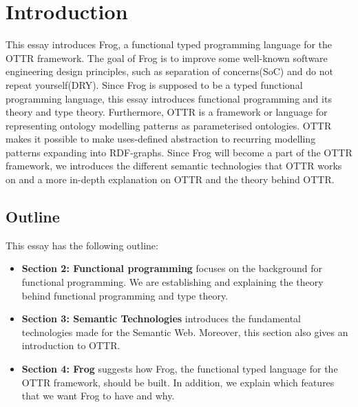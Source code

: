 
\section{Introduction}
This essay introduces Frog, a functional typed programming language for the OTTR framework. The goal of Frog is to improve some well-known software engineering design principles, such as separation of concerns(SoC) and do not repeat yourself(DRY). Since Frog is supposed to be a typed functional programming language, this essay introduces functional programming and its theory and type theory. Furthermore, OTTR is a framework or language for representing ontology modelling patterns as parameterised ontologies. OTTR makes it possible to make uses-defined abstraction to recurring modelling patterns expanding into RDF-graphs. Since Frog will become a part of the OTTR framework, we introduces the different semantic technologies that OTTR works on and a more in-depth explanation on OTTR and the theory behind OTTR. 

\subsection{Outline}

This essay has the following outline:
\begin{itemize}
    \item \textbf{Section 2: Functional programming} focuses on the background for functional programming. We are establishing and explaining the theory behind functional programming and type theory. 
    \item \textbf{Section 3: Semantic Technologies} introduces the fundamental technologies made for the Semantic Web. Moreover, this section also gives an introduction to OTTR.
    \item \textbf{Section 4: Frog} suggests how Frog, the functional typed language for the OTTR framework, should be built. In addition, we explain which features that we want Frog to have and why.
\end{itemize}